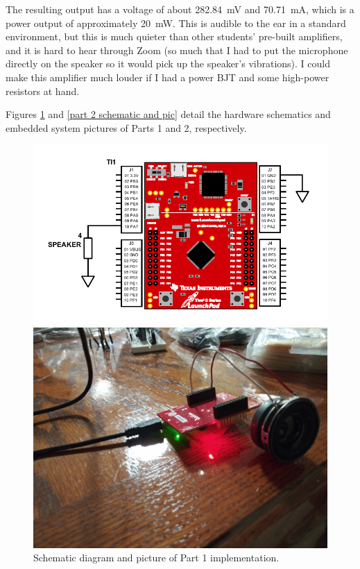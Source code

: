 \documentclass{article}
\begin{document}
The resulting output has a voltage of about \SI{282.84}{\milli\volt}
and \SI{70.71}{\milli\ampere}, which is a power output of
approximately \SI{20}{\milli\watt}. This is audible to the
ear in a standard environment, but this is much quieter than
other students' pre-built amplifiers, and it is hard to hear
through Zoom (so much that I had to put the microphone directly
on the speaker so it would pick up the speaker's vibrations).
I could make this amplifier
much louder if I had a power BJT and some high-power resistors
at hand.

Figures \ref{part 1 schematic and pic} and
\ref{part 2 schematic and pic} detail the hardware schematics
and embedded system pictures of Parts 1 and 2, respectively.

\begin{figure}[H]
	\centering
	\includegraphics[width=\textwidth]{Images/Part1Schematic}

	\includegraphics[width=\textwidth]{Images/Part1System}
	\caption{Schematic diagram and picture of Part 1 implementation.}
	\label{part 1 schematic and pic}
\end{figure}
\end{document}
